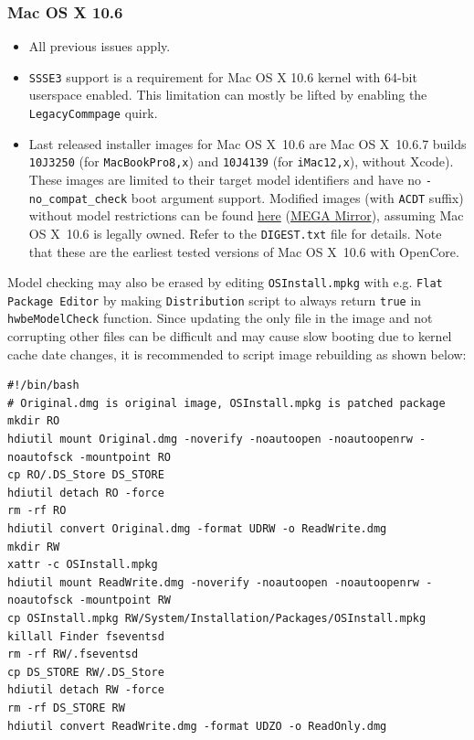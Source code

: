 \documentclass[]{article}
\begin{document}
\subsubsection{Mac OS X 10.6}\label{legacy106}

\begin{itemize}
  \item All previous issues apply.
  \item \texttt{SSSE3} support is a requirement for Mac OS X 10.6 kernel
    with 64-bit userspace enabled. This limitation can mostly be lifted
    by enabling the \texttt{LegacyCommpage} quirk.
  \item Last released installer images for Mac OS X~10.6 are Mac OS X~10.6.7
    builds \texttt{10J3250} (for \texttt{MacBookPro8,x}) and
    \texttt{10J4139} (for \texttt{iMac12,x}), without Xcode). These
    images are limited to their target model identifiers and have no
    \texttt{-no\_compat\_check} boot argument support. Modified images
    (with \texttt{ACDT} suffix) without model restrictions can be found
    \href{https://archive.org/details/10.6.7-10j3250-disk-images}{here}
    (\href{https://mega.nz/folder/z5YUhYTb#gA\_IRY5KMuYpnNCg7kR3ug}{MEGA Mirror}),
    assuming Mac OS X~10.6 is legally owned. Refer to the \texttt{DIGEST.txt} file
    for details. Note that these are the earliest tested
    versions of Mac OS X~10.6 with OpenCore.
\end{itemize}

  Model checking may also be erased by editing \texttt{OSInstall.mpkg}
  with e.g. \texttt{Flat Package Editor} by making \texttt{Distribution}
  script to always return \texttt{true} in \texttt{hwbeModelCheck} function.
  Since updating the only file in the image and not corrupting other files
  can be difficult and may cause slow booting due to kernel cache date
  changes, it is recommended to script image rebuilding as shown below:

\begin{lstlisting}[label=snowrebuild, style=ocbash]
#!/bin/bash
# Original.dmg is original image, OSInstall.mpkg is patched package
mkdir RO
hdiutil mount Original.dmg -noverify -noautoopen -noautoopenrw -noautofsck -mountpoint RO
cp RO/.DS_Store DS_STORE
hdiutil detach RO -force
rm -rf RO
hdiutil convert Original.dmg -format UDRW -o ReadWrite.dmg
mkdir RW
xattr -c OSInstall.mpkg
hdiutil mount ReadWrite.dmg -noverify -noautoopen -noautoopenrw -noautofsck -mountpoint RW
cp OSInstall.mpkg RW/System/Installation/Packages/OSInstall.mpkg
killall Finder fseventsd
rm -rf RW/.fseventsd
cp DS_STORE RW/.DS_Store
hdiutil detach RW -force
rm -rf DS_STORE RW
hdiutil convert ReadWrite.dmg -format UDZO -o ReadOnly.dmg
\end{lstlisting}
\end{document}
